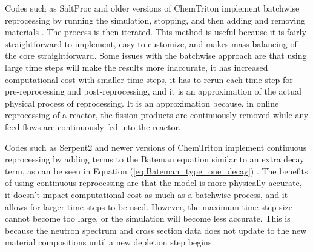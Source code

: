 Codes such as SaltProc and older versions of ChemTriton implement batchwise reprocessing by running the simulation, stopping, and then adding and removing materials \cite{rykhlevskii_modeling_2019, betzler_molten_2017}. The process is then iterated. This method is useful because it is fairly straightforward to implement, easy to customize, and makes mass balancing of the core straightforward. Some issues with the batchwise approach are that using large time steps will make the results more inaccurate, it has increased computational cost with smaller time steps, it has to rerun each time step for pre-reprocessing and post-reprocessing, and it is an approximation of the actual physical process of reprocessing. It is an approximation because, in online reprocessing of a reactor, the fission products are continuously removed while any feed flows are continuously fed into the reactor.

Codes such as Serpent2 and newer versions of ChemTriton implement continuous reprocessing by adding terms to the Bateman equation similar to an extra decay term, as can be seen in Equation (\ref{eq:Bateman_type_one_decay}) \cite{aufiero_extended_2013, jr_vicente_valdez_modeling_2020}. The benefits of using continuous reprocessing are that the model is more physically accurate, it doesn't impact computational cost as much as a batchwise process, and it allows for larger time steps to be used. However, the maximum time step size cannot become too large, or the simulation will become less accurate. This is because the neutron spectrum and cross section data does not update to the new material compositions until a new depletion step begins. 

